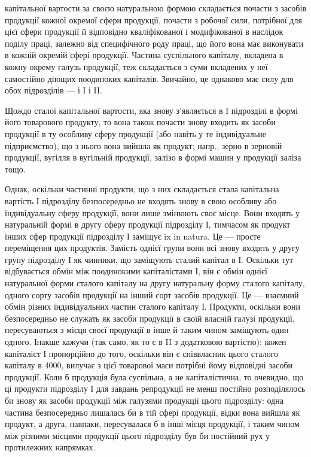 \parcont{}  %
капітальної вартости за своєю натуральною формою складається почасти
з засобів продукції кожної окремої сфери продукції, почасти з робочої
сили, потрібної для цієї сфери продукції й відповідно кваліфікованої і
модифікованої в наслідок поділу праці, залежно від специфічного роду
праці, що його вона має виконувати в кожній окремій сфері продукції.
Частина суспільного капіталу, вкладена в кожну окрему галузь продукції,
теж складається з суми вкладених у неї самостійно діющих поодиноких
капіталів. Звичайно, це однаково має силу для обох підрозділів —
і І і II.

Щождо сталої капітальної вартости, яка знову з’являється в І підрозділі
в формі його товарового продукту, то вона також почасти знову
входить як засоби продукції в ту особливу сферу продукції (або навіть у те
індивідуальне підприємство), що з нього вона вийшла як продукт; напр.,
зерно в зерновій продукції, вугілля в вугільній продукції, залізо в формі
машин у продукції заліза тощо.

Однак, оскільки частинні продукти, що з них складається стала капітальна
вартість І підрозділу безпосередньо не входять знову в свою
особливу або індивідуальну сферу продукції, вони лише змінюють своє
місце. Вони входять у натуральній формі в другу сферу продукції підрозділу
І, тимчасом як продукт інших сфер продукції підрозділу І заміщує
ix in natura. Це — просте переміщення цих продуктів. Замість однієї
групи вони всі знову входять у другу групу підрозділу І як чинники,
що заміщують сталий капітал в І. Оскільки тут відбувається обмін між
поодинокими капіталістами І, він є обмін однієї натуральної форми сталого
капіталу на другу натуральну форму сталого капіталу, одного сорту засобів
продукції на інший сорт засобів продукції. Це — взаємний обмін
різних індивідуальних частин сталого капіталу І. Продукти, оскільки вони
безпосередньо не служать як засоби продукції в своїй власній галузі продукції,
пересуваються з місця своєї продукції в інше й таким чином
заміщують один одного. Інакше кажучи (так само, як то є в II з додатковою
вартістю): кожен капіталіст І пропорційно до того, оскільки він є
співвласник цього сталого капіталу в 4000, вилучає з цієї товарової маси
потрібні йому відповідні засоби продукції. Коли б продукція була суспільна,
а не капіталістична, то очевидно, що ці продукти підрозділу І
для завдань репродукції не менш постійно розподілялось би знову як
засоби продукції між галузями продукції цього підрозділу: одна частина
безпосередньо лишалась би в тій сфері продукції, відки вона вийшла як
продукт, а друга, навпаки, пересувалася б в інші місця продукції, і таким
чином між різними місцями продукції цього підрозділу був би постійний
рух у протилежних напрямках.

